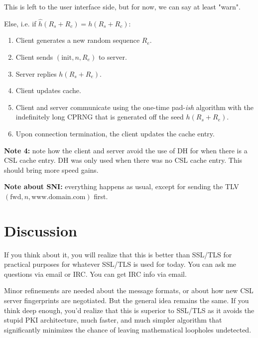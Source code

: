 \documentclass{article}
\begin{document}
\begin{enumerate}
\begin{enumerate}
\begin{enumerate}
                This is left to the user interface side, but for now, we can
                say at least "warn".
            \end{enumerate}
        Else, i.e. if $\hat h(R_s + R_c) = h(R_s + R_c)$:
            \begin{enumerate}
                \item Client generates a new random sequence $R_e$.
                \item Client sends $(\text{init}, n, R_e)$ to server.
                \item Server replies $h(R_s + R_e)$.
                \item Client updates cache.
                \item Client and server communicate using the one-time
                pad-\emph{ish} algorithm with the indefinitely long CPRNG that
                is generated off the seed $h(R_s+R_e)$.
                \item Upon connection termination, the client updates the cache
                entry.
            \end{enumerate}
        \textbf{Note 4:} note how the client and server avoid the use of DH for
        when there is a CSL cache entry. DH was only used when there was no CSL
        cache entry. This should bring more speed gains.
    \end{enumerate}
\end{enumerate}

\textbf{Note about SNI:} everything happens as usual, except for sending the
TLV $(\text{fwd}, n, \text{www.domain.com})$ first.

\section{Discussion}
If you think about it, you will realize that this is better than SSL/TLS for
practical purposes for whatever SSL/TLS is used for today. You can ask me
questions via email or IRC. You can get IRC info via email.

Minor refinements are needed about the message formats, or
about how new CSL server fingerprints are negotiated. But the general idea
remains the same. If you think deep enough, you'd realize that this is superior
to SSL/TLS as it avoids the stupid PKI architecture, much faster, and much
simpler algorithm that significantly minimizes the chance of leaving
mathematical loopholes undetected.
\end{document}
